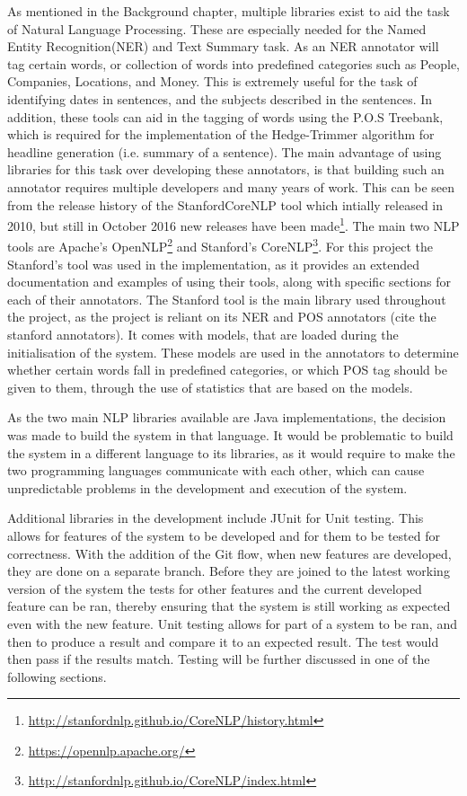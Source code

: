 \par As mentioned in the Background chapter, multiple libraries exist to aid the task of Natural Language Processing. These are especially needed for the Named Entity Recognition(NER) and Text Summary task. As an NER annotator will tag certain words, or collection of words into predefined categories such as People, Companies, Locations, and Money. This is extremely useful for the task of identifying dates in sentences, and the subjects described in the sentences. In addition, these tools can aid in the tagging of words using the P.O.S Treebank, which is required for the implementation of the Hedge-Trimmer algorithm \cite{dorrzajicschwartz2003} for headline generation (i.e. summary of a sentence). The main advantage of using libraries for this task over developing these annotators, is that building such an annotator requires multiple developers and many years of work. This can be seen from the 	release history of the StanfordCoreNLP tool which intially released in 2010, but still in October 2016 new releases have been made\footnote{\url{http://stanfordnlp.github.io/CoreNLP/history.html}}. The main two NLP tools are Apache's OpenNLP\footnote{\url{https://opennlp.apache.org/}} and Stanford's CoreNLP\footnote{\url{http://stanfordnlp.github.io/CoreNLP/index.html}}. For this project the Stanford's tool was used in the implementation, as it provides an extended documentation and examples of using their tools, along with specific sections for each of their annotators. The Stanford tool is the main library used throughout the project, as the project is reliant on its NER and POS annotators (cite the stanford annotators). It comes with models, that are loaded during the initialisation of the system. These models are used in the annotators to determine whether certain words fall in predefined categories, or which POS tag should be given to them, through the use of statistics that are based on the models. 
\par As the two main NLP libraries available are Java implementations, the decision was made to build the system in that language. It would be problematic to build the system in a different language to its libraries, as it would require to make the two programming languages communicate with each other, which can cause unpredictable problems in the development and execution of the system.
\par Additional libraries in the development include JUnit for Unit testing. This allows for features of the system to be developed and for them to be tested for correctness. With the addition of the Git flow, when new features are developed, they are done on a separate branch. Before they are joined to the latest working version of the system the tests for other features and the current developed feature can be ran, thereby ensuring that the system is still working as expected even with the new feature. Unit testing allows for part of a system to be ran, and then to produce a result and compare it to an expected result. The test would then pass if the results match. Testing will be further discussed in one of the following sections.
